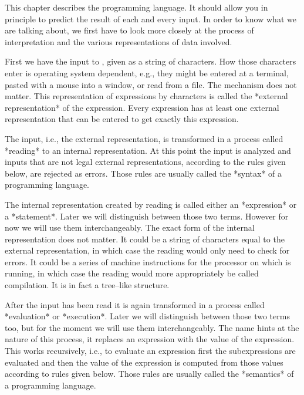 
This chapter describes the {\GAP} programming language.  It should allow
you in principle to predict the result of each and every input. In order
to know what we are talking about, we first have to look more closely at
the process of interpretation and the various representations of data
involved.

First we have the input to {\GAP}, given as a string of characters. How
those characters enter {\GAP} is operating system dependent, e.g., they
might be entered at a terminal, pasted with a mouse into a window, or
read from a file. The mechanism does not matter. This representation of
expressions by characters is called the *external representation* of the
expression. Every expression has at least one external representation
that can be entered to get exactly this expression.

The input, i.e., the external representation, is transformed in a process
called *reading* to an internal representation.  At this point the input
is analyzed and inputs  that are not legal external representations,
according to the rules given below, are rejected as errors. Those rules
are usually called the *syntax* of a programming language.

The internal representation created by reading is called either an
*expression* or a *statement*.  Later we will distinguish between those
two terms.  However for now we will use them interchangeably.
The exact form of the internal representation does not matter.
It could be a string of characters equal to the external representation,
in which case the reading would only need to check for errors.
It could be a series of machine instructions for the processor on which
{\GAP} is running, in which case the reading would more appropriately
be called compilation.
It is in fact a tree--like structure.

After the input has been read it is again transformed in a process called
*evaluation* or *execution*. Later we will distinguish between those two
terms too, but for the moment we will use them interchangeably. The name
hints at the nature of this process, it replaces an expression with the
value of the expression. This works recursively, i.e., to evaluate an
expression first the subexpressions are evaluated and then the value of
the expression is computed from those values according to rules given below.
Those rules are usually called the *semantics* of a programming language.

